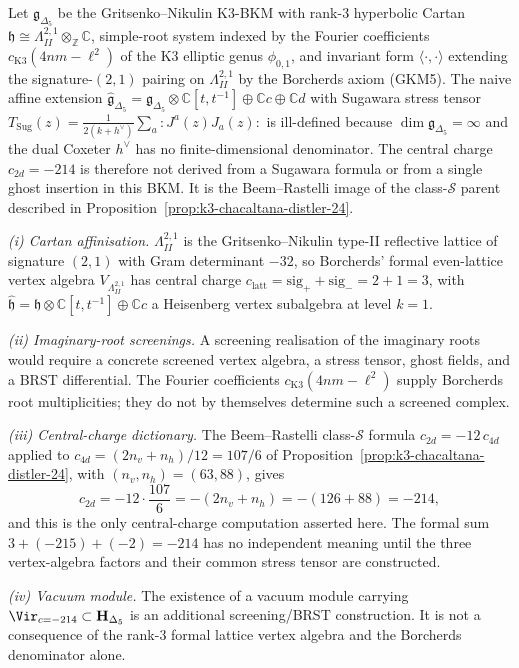 \begin{proposition}[No one-ghost derivation of the \texorpdfstring{$c=-214$}{c=-214} scalar from \texorpdfstring{$\mathfrak g_{\Delta_5}$}{g-Delta-5}]
\label{prop:k3ca-affinisation-lattice-vertex-ghost}
Let $\mathfrak g_{\Delta_5}$ be the Gritsenko--Nikulin K3-BKM with
rank-$3$ hyperbolic Cartan $\mathfrak h\cong\Lambda^{2,1}_{II}\otimes_{\mathbb Z}\mathbb C$,
simple-root system indexed by the Fourier coefficients
$c_{\mathrm{K3}}(4nm-\ell^2)$ of the K3 elliptic genus $\phi_{0,1}$,
and invariant form $\langle\cdot,\cdot\rangle$ extending the
signature-$(2,1)$ pairing on $\Lambda^{2,1}_{II}$ by the Borcherds
axiom (GKM5). The naive affine extension
$\widehat{\mathfrak g}_{\Delta_5}
= \mathfrak g_{\Delta_5}\otimes\mathbb C[t,t^{-1}]
\oplus\mathbb C c\oplus\mathbb C d$
with Sugawara stress tensor
$T_{\mathrm{Sug}}(z)
= \tfrac{1}{2(k+h^\vee)}\sum_a{:}J^a(z)J_a(z){:}$
is ill-defined because $\dim\mathfrak g_{\Delta_5}=\infty$ and the
dual Coxeter $h^\vee$ has no finite-dimensional denominator.
The central charge \(c_{2d}=-214\) is therefore not derived from a
Sugawara formula or from a single ghost insertion in this BKM.
It is the Beem--Rastelli image of the class-\(\mathcal S\) parent
described in Proposition~\ref{prop:k3-chacaltana-distler-24}.

\emph{(i) Cartan affinisation.} $\Lambda^{2,1}_{II}$ is the
Gritsenko--Nikulin type-II reflective lattice of signature $(2,1)$ with
Gram determinant $-32$, so Borcherds' formal even-lattice vertex algebra
$V_{\Lambda^{2,1}_{II}}$ has central charge
$c_{\mathrm{latt}}=\mathrm{sig}_+ + \mathrm{sig}_-=2+1=3$, with
$\widehat{\mathfrak h}=\mathfrak h\otimes\mathbb C[t,t^{-1}]\oplus\mathbb C c$
a Heisenberg vertex subalgebra at level $k=1$.

\emph{(ii) Imaginary-root screenings.} A screening realisation of the
imaginary roots would require a concrete screened vertex algebra,
a stress tensor, ghost fields, and a BRST differential. The Fourier
coefficients \(c_{\mathrm{K3}}(4nm-\ell^2)\) supply Borcherds root
multiplicities; they do not by themselves determine such a screened
complex.

\emph{(iii) Central-charge dictionary.} The Beem--Rastelli
class-$\mathcal S$ formula $c_{2d}=-12\,c_{4d}$ applied to
$c_{4d}=(2n_v+n_h)/12=107/6$ of
Proposition~\ref{prop:k3-chacaltana-distler-24}, with
$(n_v,n_h)=(63,88)$, gives
\[
 c_{2d}
 = -12\cdot\frac{107}{6}
 = -(2n_v+n_h)
 = -(126+88)
 = -214,
\]
and this is the only central-charge computation asserted here.
The formal sum \(3+(-215)+(-2)=-214\) has no independent meaning until
the three vertex-algebra factors and their common stress tensor are
constructed.

\emph{(iv) Vacuum module.} The existence of a vacuum module carrying
\(\Vir_{c=-214}\subset\mathbf H_{\Delta_5}\) is an additional
screening/BRST construction. It is not a consequence of the rank-\(3\)
formal lattice vertex algebra and the Borcherds denominator alone.
\end{proposition}

